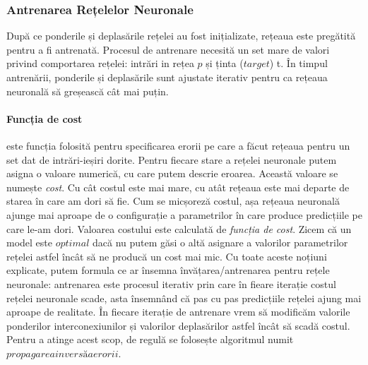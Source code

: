 \subsubsection{Antrenarea Rețelelor Neuronale}
După ce ponderile și deplasările rețelei au fost inițializate, rețeaua este pregătită pentru a fi antrenată. Procesul de antrenare necesită un set mare de valori privind comportarea rețelei: intrări in rețea $p$ și ținta ($target$) t. În timpul antrenării, ponderile și deplasările sunt ajustate iterativ pentru ca rețeaua neuronală să greșească cât mai puțin.\newline


\paragraph{Funcția de cost} este funcția folosită pentru specificarea erorii pe care a făcut rețeaua pentru un set dat de intrări-ieșiri dorite. Pentru fiecare stare a rețelei neuronale putem asigna o valoare numerică, cu care putem descrie eroarea. Această valoare se numește \textit{cost}.\newline
Cu cât costul este mai mare, cu atât rețeaua este mai departe de starea în care am dori să fie. Cum se micșoreză costul, așa rețeaua neuronală ajunge mai aproape de o configurație a parametrilor în care produce predicțiile pe care le-am dori. Valoarea costului este calculată de \textit{funcția de cost}. Zicem că un model este $optimal$ dacă nu putem găsi o altă asignare a valorilor parametrilor rețelei astfel încât să ne producă un cost mai mic.\newline
Cu toate aceste noțiuni explicate, putem formula ce ar însemna învățarea/antrenarea pentru rețele neuronale: antrenarea este procesul iterativ prin care în fieare iterație costul rețelei neuronale scade, asta însemnând că pas cu pas predicțiile rețelei ajung mai aproape de realitate. În fiecare iterație de antrenare vrem să modificăm valorile ponderilor interconexiunilor și valorilor deplasărilor astfel încât să scadă costul. Pentru a atinge acest scop, de regulă se folosește algoritmul numit $propagarea inversă a erorii$.


